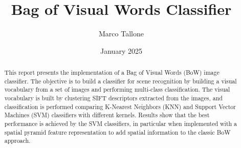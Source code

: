 \documentclass{settings/notex}
\title{
  Bag of Visual Words Classifier\\
  \vspace{0.35cm}
  \fontsize{12pt}{12pt}\selectfont{
    Computer Vision and Pattern Recognition Exam\\
    \vspace{0.25cm}
    University of Trieste (UniTS)
  }
}
\author{Marco Tallone}
\date{January 2025}
\begin{document}
\maketitle

\begin{abstract}
\noindent
This report presents the implementation of a Bag of Visual Words (BoW) image classifier.
The objective is to build a classifier for scene recognition by building a
visual vocabulary from a set of images and performing multi-class classification.
The visual vocabulary is built by clustering SIFT descriptors extracted from the
images, and classification is performed comparing K-Nearest Neighbors (KNN)
and Support Vector Machines (SVM) classifiers with different kernels.
Results show that the best performance is achieved by the SVM classifiers, in particular when implemented with a spatial pyramid feature representation to add spatial information to the classic BoW approach.
\end{abstract}








\pagebreak


\pagebreak



\pagebreak
\appendix
\renewcommand{\thesection}{\Alph{section}} %
\renewcommand{\thesubsection}{\thesection\arabic{subsection}} %

\end{document}
